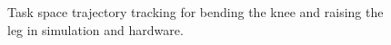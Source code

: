 \begin{figure}[!h]
	\begin{center}
	\end{center}
  	\caption{Task space trajectory tracking for bending the knee and raising the leg in simulation and hardware.}
	\label{fig:kneebendp}
\end{figure} 

\cleardoublepage

